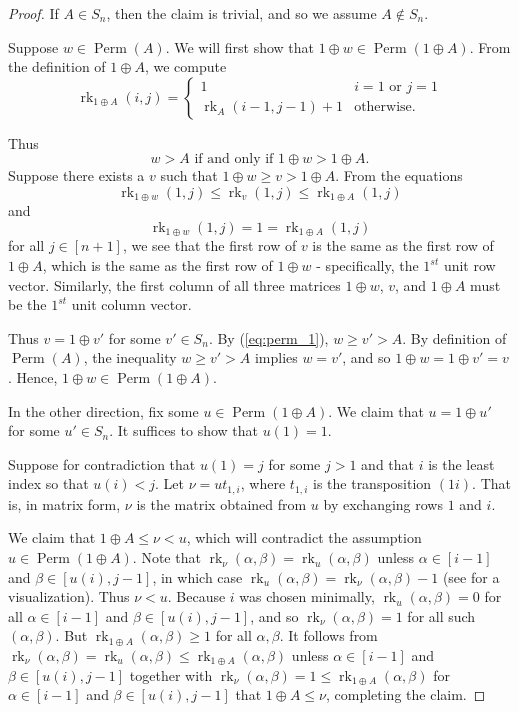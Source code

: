 \documentclass[12 pt]{amsart}
\DeclareMathOperator{\rk}{rk}
\DeclareMathOperator{\Perm}{Perm}
\theoremstyle{plain}
\theoremstyle{definition}
\theoremstyle{remark}
\begin{document}
\begin{proof}
If $A \in S_n$, then the claim is trivial, and so we assume $A \notin S_n$.

Suppose $w \in \Perm(A)$.  We will first show that $1 \oplus w \in \Perm(1 \oplus A)$.  From the definition of $1 \oplus A$, we compute \[\rk_{1 \oplus A}(i,j) = 
\begin{cases}
1 & i=1 \mbox{ or } j=1\\
\rk_A(i-1,j-1)+1 & \mbox{otherwise}.
\end{cases}
\]

Thus
\begin{equation}\label{eq:perm_1}
    \text{$w > A$ if and only if $1 \oplus w > {1 \oplus A}$.}
\end{equation}
Suppose there exists a $v$ such that $1 \oplus w \ge v > 1 \oplus A$.  From the equations
\[
    \rk_{1 \oplus w}(1,j) \le \rk_{v}(1,j) \le \rk_{1 \oplus A}(1,j)
\] and \[
 \rk_{1 \oplus w}(1,j) = 1 = \rk_{1 \oplus A}(1,j)
\]
for all $j \in [n+1]$, we see that the first row of $v$ is the same as the first row of $1 \oplus A$, which is the same as the first row of $1 \oplus w$ - specifically, the $1^{st}$ unit row vector.  Similarly, the first column of all three matrices $1 \oplus w$, $v$, and $1 \oplus A$ must be the $1^{st}$ unit column vector.  

Thus $v = 1 \oplus v'$ for some $v' \in S_n$.  By (\ref{eq:perm_1}), $w \geq v'>A$.  By definition of $\Perm(A)$, the inequality $w \geq v' > A$ implies $w=v'$, and so $1 \oplus w = 1 \oplus v'=v$.  Hence, $1 \oplus w \in \Perm(1 \oplus A)$.

In the other direction, fix some $u \in \Perm(1 \oplus A)$.  We claim that $u = 1 \oplus u'$ for some $u' \in S_n$.  It suffices to show that $u(1) = 1$.

Suppose for contradiction that $u(1) = j$ for some $j>1$ and that $i$ is the least index so that $u(i)<j$.  Let $\nu = ut_{1,i}$, where $t_{1,i}$ is the transposition $(1i)$.  That is, in matrix form, $\nu$ is the matrix obtained from $u$ by exchanging rows $1$ and $i$. 

We claim that $1 \oplus A \leq \nu <u$, which will contradict the assumption $u \in \Perm(1 \oplus A)$.  Note that $\rk_\nu(\alpha,\beta) = \rk_u(\alpha,\beta)$ unless $\alpha \in [i-1]$ and $\beta \in [u(i), j-1]$, in which case $\rk_u(\alpha,\beta) = \rk_\nu(\alpha,\beta)-1$ (see  for a visualization). Thus $\nu<u$.  Because $i$ was chosen minimally, $\rk_u(\alpha,\beta) = 0$ for all $\alpha \in [i-1]$ and $\beta \in [u(i), j-1]$, and so $\rk_\nu(\alpha,\beta) = 1$ for all such $(\alpha, \beta)$.  But $\rk_{1 \oplus A}(\alpha, \beta) \ge 1$ for all $\alpha,\beta$.  It follows from $\rk_\nu(\alpha,\beta) = \rk_u(\alpha,\beta) \leq \rk_{1 \oplus A}(\alpha, \beta)$ unless $\alpha \in [i-1]$ and $\beta \in [u(i), j-1]$ together with $\rk_\nu(\alpha,\beta) = 1 \leq \rk_{1 \oplus A}(\alpha,\beta)$ for $\alpha \in [i-1]$ and $\beta \in [u(i), j-1]$ that $1 \oplus A \leq \nu$, completing the claim.


\end{proof}
\end{document}
